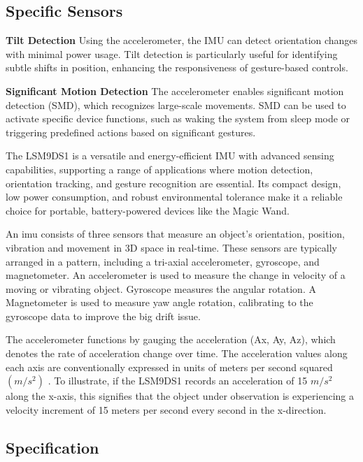 \subsection{Specific Sensors}
\textbf{Tilt Detection}
Using the accelerometer, the IMU can detect orientation changes with minimal power usage. Tilt detection is particularly useful for identifying subtle shifts in position, enhancing the responsiveness of gesture-based controls.\cite{Zhou:2020}

\textbf{Significant Motion Detection}
The accelerometer enables significant motion detection (SMD), which recognizes large-scale movements. SMD can be used to activate specific device functions, such as waking the system from sleep mode or triggering predefined actions based on significant gestures.\cite{Zhou:2020}

The LSM9DS1 is a versatile and energy-efficient IMU with advanced sensing capabilities, supporting a range of applications where motion detection, orientation tracking, and gesture recognition are essential. Its compact design, low power consumption, and robust environmental tolerance make it a reliable choice for portable, battery-powered devices like the Magic Wand.\cite{Zhou:2020}
	
An \ac{imu} consists of three sensors that measure an object's orientation, position, vibration and movement in 3D space in real-time. These sensors are typically arranged in a pattern, including a tri-axial accelerometer, gyroscope, and magnetometer\cite{Ahmad:2013}. An accelerometer is used to measure the change in velocity of a moving or vibrating object\cite{Ahmad:2013}. Gyroscope measures the angular rotation\cite{Ahmad:2013}. A Magnetometer is used to measure yaw angle rotation, calibrating to the gyroscope data to improve the big drift issue\cite{Ahmad:2013}. 

The accelerometer functions by gauging the acceleration (Ax, Ay, Az), which denotes the rate of acceleration change over time. The acceleration values along each axis are conventionally expressed in units of meters per second squared $(m/s^2)$ \cite{Vernier:2023}. To illustrate, if the LSM9DS1 records an acceleration of 15 $m/s^2$ along the x-axis, this signifies that the object under observation is experiencing a velocity increment of 15 meters per second every second in the x-direction.

\subsection{Specification}
